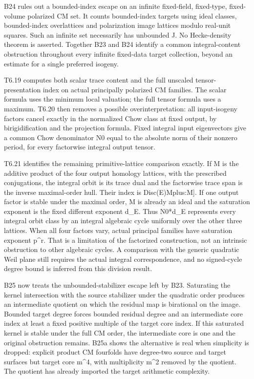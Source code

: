 \documentclass[11pt,a4paper]{article}
\theoremstyle{definition}
\begin{document}
B24 rules out a bounded-index escape on an infinite fixed-field,
fixed-type, fixed-volume polarized CM set. It counts bounded-index
targets using ideal classes, bounded-index overlattices and polarization
image lattices modulo real-unit squares. Such an infinite set
necessarily has unbounded J. No Hecke-density theorem is asserted.
Together B23 and B24 identify a common integral-content obstruction
throughout every infinite fixed-data target collection, beyond an
estimate for a single preferred isogeny.

T6.19 computes both scalar trace content and the full unscaled
tensor-presentation index on actual principally polarized CM families.
The scalar formula uses the minimum local valuation; the full tensor
formula uses a maximum. T6.20 then removes a possible
overinterpretation: all input-isogeny factors cancel exactly in the
normalized Chow class at fixed output, by birigidification and the
projection formula. Fixed integral input eigenvectors give a common Chow
denominator N0 equal to the absolute norm of their nonzero period, for
every factorwise integral output tensor.

T6.21 identifies the remaining primitive-lattice comparison exactly. If
M is the additive product of the four output homology lattices, with the
prescribed conjugations, the integral orbit is its trace dual and the
factorwise trace span is the inverse maximal-order hull. Their index is
\textbar Disc(E)\textbar{[}Mplus:M{]}. If one output factor is stable
under the maximal order, M is already an ideal and the saturation
exponent is the fixed different exponent d\_E. Thus N0*d\_E represents
every integral orbit class by an integral algebraic cycle uniformly over
the other three lattices. When all four factors vary, actual principal
families have saturation exponent p\^{}r. That is a limitation of the
factorized construction, not an intrinsic obstruction to other algebraic
cycles. A comparison with the generic quadratic Weil plane still
requires the actual integral correspondence, and no signed-cycle degree
bound is inferred from this division result.

B25 now treats the unbounded-stabilizer escape left by B23. Saturating
the kernel intersection with the source stabilizer under the quadratic
order produces an intermediate quotient on which the residual map is
birational on the image. Bounded target degree forces bounded residual
degree and an intermediate core index at least a fixed positive multiple
of the target core index. If this saturated kernel is stable under the
full CM order, the intermediate core is one and the original obstruction
remains. B25a shows the alternative is real when simplicity is dropped:
explicit product CM fourfolds have degree-two source and target surfaces
but target core m\^{}4, with multiplicity m\^{}2 removed by the
quotient. The quotient has already imported the target arithmetic
complexity.
\end{document}
